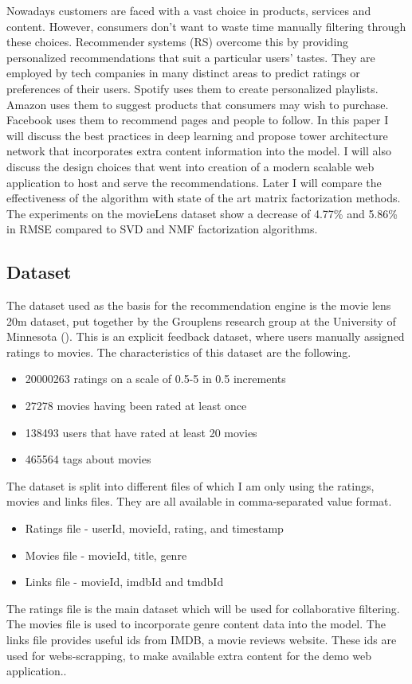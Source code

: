 Nowadays customers are faced with a vast choice in products, services and content. However, consumers don't want to waste time manually filtering through these choices. Recommender systems (RS) overcome this by providing personalized recommendations that suit a particular users' tastes. They are employed by tech companies in many distinct areas to predict ratings or preferences of their users. Spotify uses them to create personalized playlists. Amazon uses them to suggest products that consumers may wish to purchase. Facebook uses them to recommend pages and people to follow. In this paper I will discuss the best practices in deep learning and propose tower architecture network that incorporates extra content information into the model. I will also discuss the design choices that went into creation of a modern scalable web application to host and serve the recommendations. Later I will compare the effectiveness of the algorithm with state of the art matrix factorization methods. The experiments on the movieLens dataset show a decrease of 4.77\% and 5.86\% in RMSE compared to SVD and NMF factorization algorithms.

\subsection{Dataset}
The dataset used as the basis for the recommendation engine is the movie lens 20m dataset, put together by the Grouplens research group at the University of Minnesota (\citet{movielens}).
This is an explicit feedback dataset, where users manually assigned ratings to movies. The characteristics of this dataset are the following.
\begin{itemize}
    \item 20000263 ratings on a scale of 0.5-5 in 0.5 increments
    \item 27278 movies having been rated at least once
    \item 138493 users that have rated at least 20 movies
    \item 465564 tags about movies
\end{itemize}
The dataset is split into different files of which I am only using the ratings, movies and links files. They are all available in comma-separated value format.
\begin{itemize}
    \item Ratings file - userId, movieId, rating, and timestamp
    \item Movies file - movieId, title, genre
    \item Links file - movieId, imdbId and tmdbId
\end{itemize}
The ratings file is the main dataset which will be used for collaborative filtering. The movies file is used to incorporate genre content data into the model. The links file provides useful ids from IMDB, a movie reviews website. These ids are used for webs-scrapping, to make available extra content for the demo web application..

